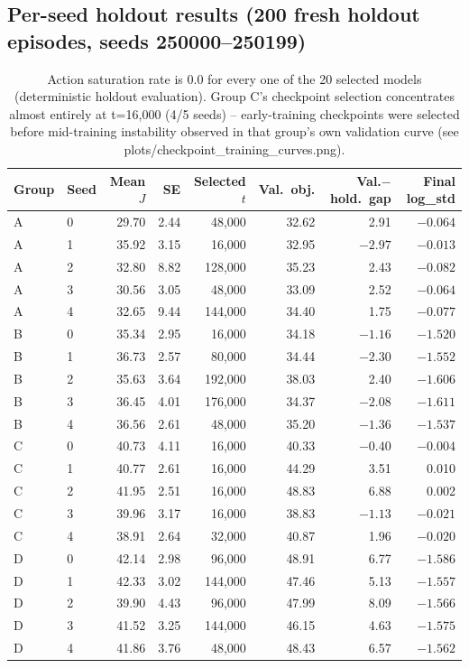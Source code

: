 \subsection*{Per-seed holdout results (200 fresh holdout episodes, seeds 250000--250199)}
\begin{table}[h]
\centering
\small
\begin{tabular}{llrrrrrr}
\hline
Group & Seed & Mean $J$ & SE & Selected $t$ & Val.\ obj. & Val.$-$hold.\ gap & Final log\_std \\
\hline
A & 0 & 29.70 & 2.44 & 48{,}000  & 32.62 & 2.91  & $-0.064$ \\
A & 1 & 35.92 & 3.15 & 16{,}000  & 32.95 & $-2.97$ & $-0.013$ \\
A & 2 & 32.80 & 8.82 & 128{,}000 & 35.23 & 2.43  & $-0.082$ \\
A & 3 & 30.56 & 3.05 & 48{,}000  & 33.09 & 2.52  & $-0.064$ \\
A & 4 & 32.65 & 9.44 & 144{,}000 & 34.40 & 1.75  & $-0.077$ \\
\hline
B & 0 & 35.34 & 2.95 & 16{,}000  & 34.18 & $-1.16$ & $-1.520$ \\
B & 1 & 36.73 & 2.57 & 80{,}000  & 34.44 & $-2.30$ & $-1.552$ \\
B & 2 & 35.63 & 3.64 & 192{,}000 & 38.03 & 2.40  & $-1.606$ \\
B & 3 & 36.45 & 4.01 & 176{,}000 & 34.37 & $-2.08$ & $-1.611$ \\
B & 4 & 36.56 & 2.61 & 48{,}000  & 35.20 & $-1.36$ & $-1.537$ \\
\hline
C & 0 & 40.73 & 4.11 & 16{,}000 & 40.33 & $-0.40$ & $-0.004$ \\
C & 1 & 40.77 & 2.61 & 16{,}000 & 44.29 & 3.51  & 0.010 \\
C & 2 & 41.95 & 2.51 & 16{,}000 & 48.83 & 6.88  & 0.002 \\
C & 3 & 39.96 & 3.17 & 16{,}000 & 38.83 & $-1.13$ & $-0.021$ \\
C & 4 & 38.91 & 2.64 & 32{,}000 & 40.87 & 1.96  & $-0.020$ \\
\hline
D & 0 & 42.14 & 2.98 & 96{,}000  & 48.91 & 6.77 & $-1.586$ \\
D & 1 & 42.33 & 3.02 & 144{,}000 & 47.46 & 5.13 & $-1.557$ \\
D & 2 & 39.90 & 4.43 & 96{,}000  & 47.99 & 8.09 & $-1.566$ \\
D & 3 & 41.52 & 3.25 & 144{,}000 & 46.15 & 4.63 & $-1.575$ \\
D & 4 & 41.86 & 3.76 & 48{,}000  & 48.43 & 6.57 & $-1.562$ \\
\hline
\end{tabular}
\caption{Action saturation rate is 0.0 for every one of the 20 selected models (deterministic
holdout evaluation). Group C's checkpoint selection concentrates almost entirely at t=16{,}000
(4/5 seeds) -- early-training checkpoints were selected before mid-training instability observed
in that group's own validation curve (see plots/checkpoint\_training\_curves.png).}
\end{table}

